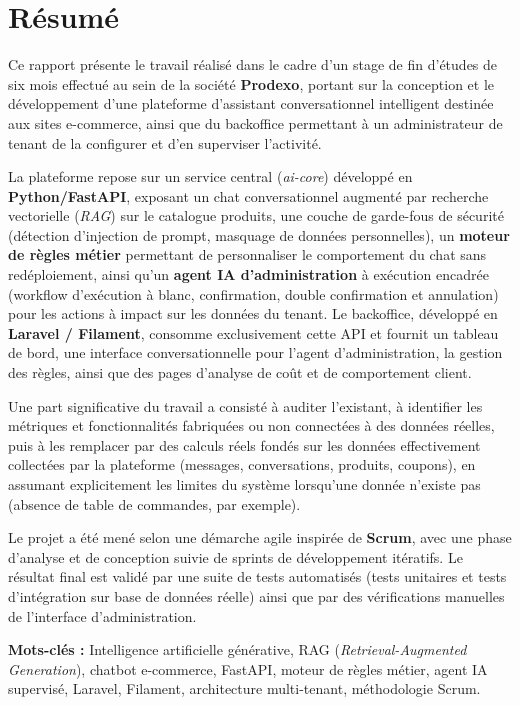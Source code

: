 \chapter*{Résumé}

Ce rapport présente le travail réalisé dans le cadre d'un stage de fin d'études de six mois effectué au sein de la société \textbf{Prodexo}, portant sur la conception et le développement d'une plateforme d'assistant conversationnel intelligent destinée aux sites e-commerce, ainsi que du backoffice permettant à un administrateur de tenant de la configurer et d'en superviser l'activité.

La plateforme repose sur un service central (\emph{ai-core}) développé en \textbf{Python/FastAPI}, exposant un chat conversationnel augmenté par recherche vectorielle (\emph{RAG}) sur le catalogue produits, une couche de garde-fous de sécurité (détection d'injection de prompt, masquage de données personnelles), un \textbf{moteur de règles métier} permettant de personnaliser le comportement du chat sans redéploiement, ainsi qu'un \textbf{agent IA d'administration} à exécution encadrée (workflow d'exécution à blanc, confirmation, double confirmation et annulation) pour les actions à impact sur les données du tenant. Le backoffice, développé en \textbf{Laravel / Filament}, consomme exclusivement cette API et fournit un tableau de bord, une interface conversationnelle pour l'agent d'administration, la gestion des règles, ainsi que des pages d'analyse de coût et de comportement client.

Une part significative du travail a consisté à auditer l'existant, à identifier les métriques et fonctionnalités fabriquées ou non connectées à des données réelles, puis à les remplacer par des calculs réels fondés sur les données effectivement collectées par la plateforme (messages, conversations, produits, coupons), en assumant explicitement les limites du système lorsqu'une donnée n'existe pas (absence de table de commandes, par exemple).

Le projet a été mené selon une démarche agile inspirée de \textbf{Scrum}, avec une phase d'analyse et de conception suivie de sprints de développement itératifs. Le résultat final est validé par une suite de tests automatisés (tests unitaires et tests d'intégration sur base de données réelle) ainsi que par des vérifications manuelles de l'interface d'administration.

\vspace{0.5cm}
\noindent\textbf{Mots-clés :} Intelligence artificielle générative, RAG (\emph{Retrieval-Augmented Generation}), chatbot e-commerce, FastAPI, moteur de règles métier, agent IA supervisé, Laravel, Filament, architecture multi-tenant, méthodologie Scrum.

